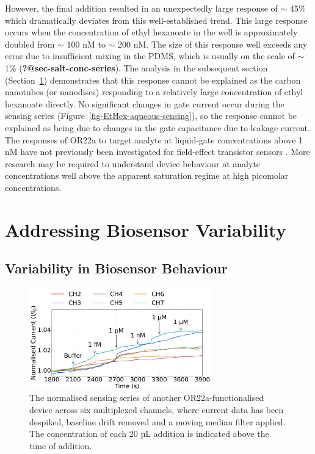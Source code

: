 \documentclass[
  a4paper,
]{scrbook}
\begin{document}
However, the final addition resulted in an unexpectedly large response
of \(\sim\) 45\% which dramatically deviates from this well-established
trend. This large response occurs when the concentration of ethyl
hexanoate in the well is approximately doubled from \(\sim\) 100 nM to
\(\sim\) 200 nM. The size of this response well exceeds any error due to
insufficient mixing in the PDMS, which is usually on the scale of
\(\sim\) 1\% (\textbf{?@sec-salt-conc-series}). The analysis in the
subsequent section (Section~\ref{sec-variability}) demonstrates that
this response cannot be explained as the carbon nanotubes (or nanodiscs)
responding to a relatively large concentration of ethyl hexanoate
directly. No significant changes in gate current occur during the
sensing series (Figure~\ref{fig-EtHex-aqueous-sensing}), so the response
cannot be explained as being due to changes in the gate capacitance due
to leakage current. The responses of OR22a to target analyte at
liquid-gate concentrations above 1 nM have not previously been
investigated for field-effect transistor sensors
\autocite{Murugathas2019a,Murugathas2020}. More research may be required
to understand device behaviour at analyte concentrations well above the
apparent saturation regime at high picomolar concentrations.

\hypertarget{sec-variability}{%
\section{Addressing Biosensor Variability}\label{sec-variability}}

\hypertarget{sec-variability-biosensor}{%
\subsection{Variability in Biosensor
Behaviour}\label{sec-variability-biosensor}}

\begin{figure}

{\centering \includegraphics[width=0.7\textwidth,height=\textheight]{figures/ch7/Q4C4_OR22a_Functionalised_filtered_detrend_trunc_arrows_normalised.png}

}

\caption{\label{fig-OR22a-variability}The normalised sensing series of
another OR22a-functionalised device across six multiplexed channels,
where current data has been despiked, baseline drift removed and a
moving median filter applied. The concentration of each 20 µL addition
is indicated above the time of addition.}

\end{figure}
\end{document}
